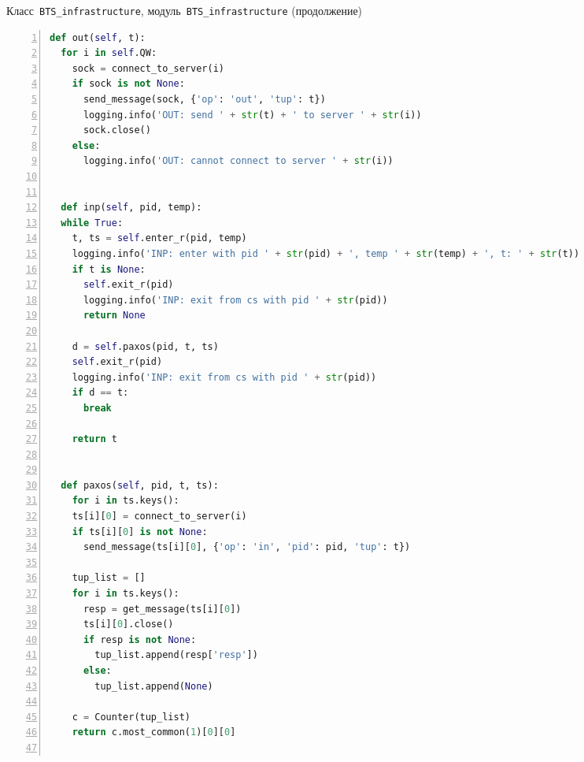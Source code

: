 \begin{ListingEnv}[p]\caption{Класс~\texttt{\small BTS_infrastructure}, модуль~\texttt{\small BTS_infrastructure} (продолжение)}\label{list:bts4}
	\begin{lstlisting}[language=Python, numbers=left]        
  def out(self, t):
  for i in self.QW:
    sock = connect_to_server(i)
    if sock is not None:
      send_message(sock, {'op': 'out', 'tup': t})
      logging.info('OUT: send ' + str(t) + ' to server ' + str(i))
      sock.close()
    else:
      logging.info('OUT: cannot connect to server ' + str(i))


  def inp(self, pid, temp):
  while True:
    t, ts = self.enter_r(pid, temp)
    logging.info('INP: enter with pid ' + str(pid) + ', temp ' + str(temp) + ', t: ' + str(t))
    if t is None:
      self.exit_r(pid)
      logging.info('INP: exit from cs with pid ' + str(pid))
      return None

    d = self.paxos(pid, t, ts)
    self.exit_r(pid)
    logging.info('INP: exit from cs with pid ' + str(pid))
    if d == t:
      break

    return t


  def paxos(self, pid, t, ts):
    for i in ts.keys():
    ts[i][0] = connect_to_server(i)
    if ts[i][0] is not None:
      send_message(ts[i][0], {'op': 'in', 'pid': pid, 'tup': t})
    
    tup_list = []
    for i in ts.keys():
      resp = get_message(ts[i][0])
      ts[i][0].close()
      if resp is not None:
        tup_list.append(resp['resp'])
      else:
        tup_list.append(None)
    
    c = Counter(tup_list)
    return c.most_common(1)[0][0]
    
	\end{lstlisting}
\end{ListingEnv}

